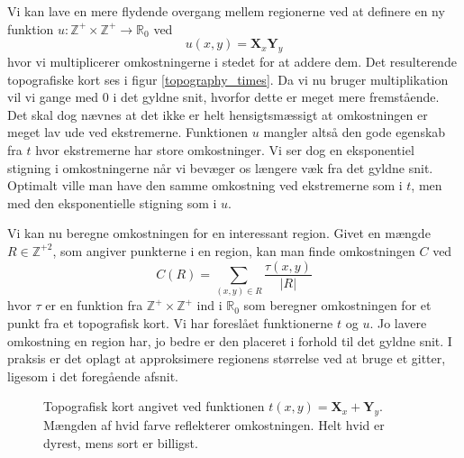 {Vi kan lave en mere flydende overgang mellem regionerne ved at definere
en ny funktion $u : \mathbb{Z}^{+} \times \mathbb{Z}^{+} \rightarrow
\mathbb{R}_{0}$ ved
\begin{equation}
    u(x, y) = \mathbf{X}_x\mathbf{Y}_y
    \label{topo_multiply}
\end{equation}
hvor vi multiplicerer omkostningerne i stedet for at addere dem. Det
resulterende topografiske kort ses i figur \ref{topography_times}. Da vi
nu bruger multiplikation vil vi gange med $0$ i det gyldne snit, hvorfor
dette er meget mere fremstående. Det skal dog nævnes at det ikke er helt
hensigtsmæssigt at omkostningen er meget lav ude ved ekstremerne.
Funktionen $u$ mangler altså den gode egenskab fra $t$ hvor ekstremerne
har store omkostninger.  Vi ser dog en eksponentiel stigning i
omkostningerne når vi bevæger os længere væk fra det gyldne snit.
Optimalt ville man have den samme omkostning ved ekstremerne som i $t$,
men med den eksponentielle stigning som i $u$.

Vi kan nu beregne omkostningen for en interessant region. Givet en
mængde $R \in \mathbb{Z}^{+2}$, som angiver
punkterne i en region, kan man finde omkostningen $C$ ved
\begin{equation}
    C(R) = \sum_{(x, y) \in R}{\frac{\tau(x, y)}{|R|}}
\end{equation}
hvor $\tau$ er en funktion fra $\mathbb{Z}^{+}\times\mathbb{Z}^{+}$ ind
i $\mathbb{R}_0$ som beregner omkostningen for et punkt fra et
topografisk kort. Vi har foreslået funktionerne $t$ og $u$. Jo lavere
omkostning en region har, jo bedre er den placeret i forhold til det
gyldne snit. I praksis er det oplagt at approksimere regionens
størrelse ved at bruge et gitter, ligesom i det foregående afsnit.


\begin{figure}[h]
    \setlength\fboxsep{0pt}
    \setlength\fboxrule{0.5pt}
    \begin{center}
    \end{center}
    \caption[]{Topografisk kort angivet ved funktionen $t(x, y) =
    \mathbf{X}_x + \mathbf{Y}_y$. Mængden af hvid farve reflekterer
    omkostningen. Helt hvid er dyrest, mens sort er billigst.}
    \label{topography_plus}
\end{figure}

}
